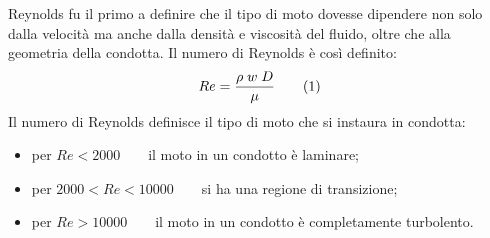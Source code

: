Reynolds fu il primo a definire che il tipo di moto dovesse dipendere non solo dalla velocità ma anche dalla densità e viscosità del fluido, oltre che alla geometria della condotta. Il numero di Reynolds è così definito:
\[Re=\frac{\rho \; w \; D}{\mu}\addtag\label{eq:reynolds}\]
Il numero di Reynolds definisce il tipo di moto che si instaura in condotta:
\begin{itemize}
    \item per \(Re<2000\qquad\)il moto in un condotto è laminare;
    \item per \(2000<Re<10000\qquad\)si ha una regione di transizione;
    \item per \(Re>10000\qquad\)il moto in un condotto è completamente turbolento.
\end{itemize}
